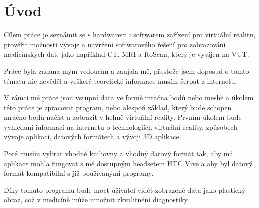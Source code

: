 \chapter*{Úvod}
{}

Cílem práce je seznámit se s hardwarem i softwarem zařízení pro virtuální realitu, prověřit možnosti vývoje a navržení softwarového řešení pro zobrazování medicínských dat, jako například CT, MRI a RoScan, který je vyvíjen na VUT.

Práce byla zadána mým vedoucím a zaujala mě,  přestože jsem doposud o tomto tématu nic nevěděl a veškeré teoretické informace musím čerpat z internetu. 

V rámci mé práce jsou vstupní data ve formě  mračna bodů nebo meshe a úkolem této práce je zpracovat program, nebo alespoň základ, který bude schopen mračno bodů načíst a zobrazit v helmě virtuální reality.
Prvním úkolem bude vyhledání informací na internetu o technologiích virtuální reality, způsobech vývoje aplikací, datových formátech a vývoji 3D aplikace.

Poté musím vybrat vhodné knihovny a vhodný datový formát tak, aby má aplikace mohla fungovat s mě dostupným headsetem HTC Vive a aby byl datový formát kompatibilní s již používanými programy.

Díky tomuto programu bude moct uživatel vidět zobrazené data jako plastický obraz, což v medicíně může umožnit zkvalitnění diagnostiky. 